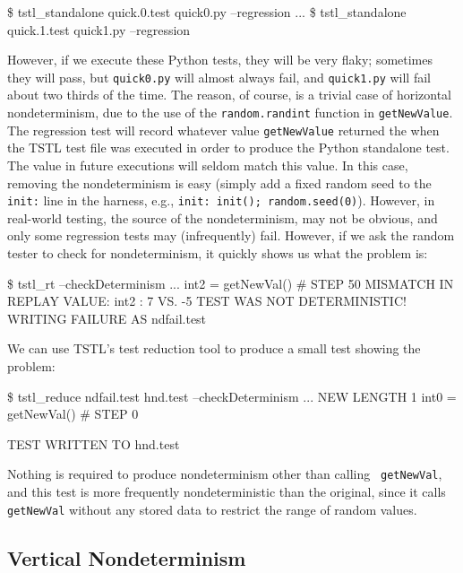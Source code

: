 {\scriptsize
\begin{code}
 \$ tstl\_standalone quick.0.test quick0.py --regression
 ...
 \$ tstl\_standalone quick.1.test quick1.py --regression
\end{code}
}

However, if we execute these Python tests, they will be very flaky;
sometimes they will pass, but {\tt quick0.py} will almost always fail, and
{\tt quick1.py} will fail about two thirds of the time.  The reason,
of course, is a trivial case of horizontal nondeterminism, due to the
use of the {\tt random.randint} function in {\tt getNewValue}.  The
regression test will record whatever value {\tt getNewValue} returned
the when the TSTL test file was executed in order to produce the
Python standalone test.  The value in future executions will seldom
match this value.  In this case, removing the nondeterminism is easy
(simply add a fixed random seed to the {\tt init:} line in the
harness, e.g., {\tt init: init(); random.seed(0)}).  However, in
real-world testing, the source of the nondeterminism, may not be
obvious, and only some regression tests may (infrequently) fail.
However, if we ask the random tester to check for nondeterminism, it
quickly shows us what the problem is:

{\scriptsize
\begin{code}
 \$ tstl\_rt --checkDeterminism
 ...
 int2 = getNewVal()              \# STEP 50
 MISMATCH IN REPLAY VALUE:
    int2 : 7 VS. -5
 TEST WAS NOT DETERMINISTIC!  WRITING FAILURE AS
 ndfail.test
\end{code}
}

We can use TSTL's test reduction tool to produce a small test showing
the problem:

{\scriptsize
\begin{code}
 \$ tstl\_reduce ndfail.test hnd.test --checkDeterminism
 ...
 NEW LENGTH 1
 int0 = getNewVal()              \# STEP 0

 TEST WRITTEN TO hnd.test
\end{code}
}

Nothing is required to produce nondeterminism other than calling {\tt
  getNewVal}, and this test is more frequently nondeterministic than
the original, since it calls {\tt getNewVal} without any stored data
to restrict the range of random values.

\subsection{Vertical Nondeterminism}


